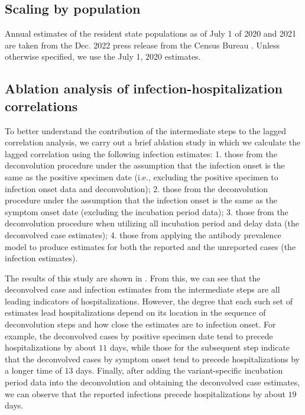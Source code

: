 \subsection{Scaling by population}

Annual estimates of the resident state
populations as of July 1 of 2020 and 2021 are taken from the Dec.
2022 press release from the \US Census Bureau \citep{uscensus2022annual}.
Unless otherwise specified, we use the July 1, 2020 estimates.


\subsection{Ablation analysis of infection-hospitalization correlations}

To better understand the contribution of the intermediate steps to the lagged
correlation analysis, we carry out a brief ablation study in which we calculate
the lagged correlation using the following infection estimates: 1. those from
the deconvolution procedure under the assumption that the infection onset is the
same as the positive specimen date (i.e., excluding the positive specimen to
infection onset data and deconvolution); 2. those from the deconvolution
procedure under the assumption that the infection onset is the same as the
symptom onset date (excluding the incubation period data); 3. those from the
deconvolution procedure when utilizing all incubation period and delay data (the
deconvolved case estimates); 4. those from applying the antibody prevalence
model to produce estimates for both the reported and the unreported cases (the
infection estimates).

The results of this study are shown in . From
this, we can see that the deconvolved case and infection estimates from the
intermediate steps are all leading indicators of hospitalizations. However, the
degree that each such set of estimates lead hospitalizations depend on its
location in the sequence of deconvolution steps and how close the estimates are to infection
onset. For example, the deconvolved cases by positive specimen date tend to
precede hospitalizations by about $11$ days, while those for the subsequent step
indicate that the deconvolved cases by symptom onset tend to precede
hospitalizations by a longer time of $13$ days. Finally, after adding the
variant-specific incubation period data into the deconvolution and obtaining the
deconvolved case estimates, we can observe that the reported infections precede
hospitalizations by about $19$ days. 

